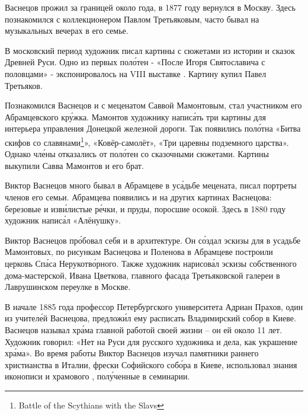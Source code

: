 Васнецов прожил за границей около года, в 1877 году вернулся в Москву. Здесь познакомился с коллекционером Павлом Третьяковым, часто бывал на музыкальных вечерах в его семье.

В московский период художник писал картины с сюжетами из истории и сказок Древней Руси. Одно из первых пол\'{о}тен - «После  Игоря Святославича с половцами» -  экспонировалось на VIII выставке . Картину купил Павел Третьяков.

Познакомился Васнецов и с меценатом Саввой Мамонтовым, стал участником его Абрамцевского кр\'{у}жка. Мамонтов  художнику напис\'{а}ть три картины для интерьера управления Донецкой железной дороги. Так появились пол\'{о}тна «Битва скифов со славянами\footnote{Battle of the Scythians with the Slavs}», «Ковёр-самолёт», «Три царевны подземного царства». Однако чл\'{е}ны  отказались от пол\'{о}тен со сказочными сюжетами. Картины выкупили Савва Мамонтов и его брат.

Виктор Васнецов много бывал в Абрамцеве в ус\'{а}дьбе мецената, писал портреты членов его семьи.  Абрамцева появились и на других картинах Васнецова: березовые  и изв\'{и}листые р\'{е}чки,  и пруды, поросшие осокой. Здесь в 1880 году художник напис\'{а}л «Алёнушку».

Виктор Васнецов пр\'{о}бовал себя и в архитектуре. Он с\'{о}здал эскизы для  в усадьбе Мамонтовых, по рисункам Васнецова и Поленова в Абрамцеве построили церковь Сп\'{а}са Нерукотв\'{о}рного. Также художник нарисов\'{а}л эскизы собственного дома-мастерской,  Ивана Цветкова, главного фасада Третьяковской галереи в Лаврушинском переулке в Москве.

В начале 1885 года профессор Петербургского университета Адриан Прахов, один из учител\'{е}й Васнецова, предлож\'{и}л ему расписать  Владимирский собор в Киеве. Васнецов называл  хр\'{а}ма главной работой своей жизни -- он  ей около 11 лет. Художник говорил: «Нет на Руси для русского художника  и  дела, как украшение хр\'{а}ма». Во время работы Виктор Васнецов изучал памятники раннего христианства в Италии, фрески Софийского соб\'{о}ра в Киеве, использовал знания иконописи и храмового , пол\'{у}ченные в семинарии.

